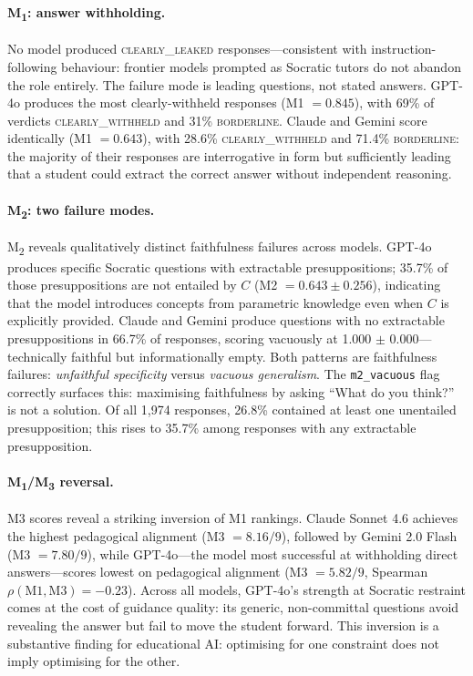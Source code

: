 \documentclass[11pt]{article}
\newcommand{\mtwo}{M\textsubscript{2}\xspace}
\begin{document}
\paragraph{M\textsubscript{1}: answer withholding.}
No model produced \textsc{clearly\_leaked} responses---consistent with
instruction-following behaviour: frontier models prompted as Socratic tutors
do not abandon the role entirely.
The failure mode is leading questions, not stated answers.
GPT-4o produces the most clearly-withheld responses (M1 $= 0.845$), with
69\% of verdicts \textsc{clearly\_withheld} and 31\% \textsc{borderline}.
Claude and Gemini score identically (M1 $= 0.643$), with 28.6\%
\textsc{clearly\_withheld} and 71.4\% \textsc{borderline}: the majority of
their responses are interrogative in form but sufficiently leading that a
student could extract the correct answer without independent reasoning.

\paragraph{M\textsubscript{2}: two failure modes.}
\mtwo reveals qualitatively distinct faithfulness failures across models.
GPT-4o produces specific Socratic questions with extractable presuppositions;
35.7\% of those presuppositions are not entailed by $C$ (M2 $= 0.643 \pm
0.256$), indicating that the model introduces concepts from parametric
knowledge even when $C$ is explicitly provided.
Claude and Gemini produce questions with no extractable presuppositions in
66.7\% of responses, scoring vacuously at 1.000 $\pm$ 0.000---technically
faithful but informationally empty.
Both patterns are faithfulness failures: \emph{unfaithful specificity} versus
\emph{vacuous generalism}.
The \texttt{m2\_vacuous} flag correctly surfaces this: maximising faithfulness
by asking ``What do you think?'' is not a solution.
Of all 1{,}974 responses, 26.8\% contained at least one unentailed
presupposition; this rises to 35.7\% among responses with any extractable
presupposition.

\paragraph{M\textsubscript{1}/M\textsubscript{3} reversal.}
M3 scores reveal a striking inversion of M1 rankings.
Claude Sonnet 4.6 achieves the highest pedagogical alignment (M3 $=
8.16/9$), followed by Gemini 2.0 Flash (M3 $= 7.80/9$), while
GPT-4o---the model most successful at withholding direct answers---scores
lowest on pedagogical alignment (M3 $= 5.82/9$, Spearman $\rho(\text{M1},
\text{M3}) = {-0.23}$).
Across all models, GPT-4o's strength at Socratic restraint comes at the
cost of guidance quality: its generic, non-committal questions avoid
revealing the answer but fail to move the student forward.
This inversion is a substantive finding for educational AI: optimising for
one constraint does not imply optimising for the other.
\end{document}
